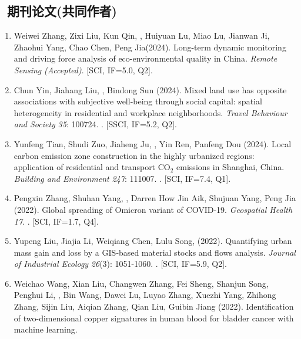 \subsection*{\texorpdfstring{\faBook\ 期刊论文(共同作者)}{期刊论文(共同作者)}}
\begin{enumerate}
\item
    Weiwei Zhang, Zixi Liu, Kun Qin, \Shaoqing, Huiyuan Lu, Miao Lu, Jianwan Ji, Zhaohui Yang, Chao Chen, Peng Jia\CS (2024).
    Long-term dynamic monitoring and driving force analysis of eco-environmental quality in China. 
    \textit{Remote Sensing} \textit{(Accepted)}. [SCI, IF=5.0, Q2].
\item
    Chun Yin, Jiahang Liu, \Shaoqing, Bindong Sun (2024).
    Mixed land use has opposite associations with subjective well-being through social capital: spatial heterogeneity in residential and workplace neighborhoods.
    \textit{Travel Behaviour and Society} \textit{35}: 100724.
    . [SSCI, IF=5.2, Q2].
\item
    Yunfeng Tian, Shudi Zuo, Jiaheng Ju, \Shaoqing, Yin Ren, Panfeng Dou (2024).
    Local carbon emission zone construction in the highly urbanized regions: application of residential and transport CO$_2$ emissions in Shanghai, China.
    \textit{Building and Environment} \textit{247}: 111007.
    . [SCI, IF=7.4, Q1].
\item
    Pengxin Zhang, Shuhan Yang, \Shaoqing, Darren How Jin Aik, Shujuan Yang, Peng Jia (2022).
    Global spreading of Omicron variant of COVID-19.
    \textit{Geospatial Health} \textit{17}.
    . [SCI, IF=1.7, Q4].
\item
    Yupeng Liu, Jiajia Li, Weiqiang Chen, Lulu Song, \Shaoqing \enspace (2022).
    Quantifying urban mass gain and loss by a GIS‐based material stocks and flows analysis.
    \textit{Journal of Industrial Ecology} \textit{26}(3): 1051-1060.
    . [SCI, IF=5.9, Q2].
\item
    Weichao Wang, Xian Liu, Changwen Zhang, Fei Sheng, Shanjun Song, Penghui Li, \Shaoqing, Bin Wang, Dawei Lu, Luyao Zhang, Xuezhi Yang, Zhihong Zhang, Sijin Liu, Aiqian Zhang, Qian Liu, Guibin Jiang (2022).
    Identification of two-dimensional copper signatures in human blood for bladder cancer with machine learning.

\end{enumerate}
